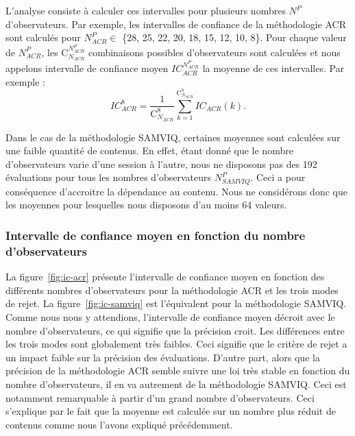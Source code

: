 L'analyse consiste à calculer ces intervalles pour plusieurs nombres $N^P$ d'observateurs. Par exemple, les intervalles de confiance de la méthodologie ACR sont calculés pour $N_{\mathit{ACR}}^P \in$ \{28, 25, 22, 20, 18, 15, 12, 10, 8\}. Pour chaque valeur de $N_{\mathit{ACR}}^P$, les $\text{C}_{N_\mathit{ACR}}^{N_{\mathit{ACR}}^P}$ combinaisons possibles d'observateurs sont calculées et nous appelons intervalle de confiance moyen $\mathit{IC}_{\mathit{ACR}}^{N_{\mathit{ACR}}^P}$ la moyenne de ces intervalles. Par exemple :
\begin{equation}
\mathit{IC}_{\mathit{ACR}}^8 = \frac{1}{\text{C}_{N_\mathit{ACR}}^8} \sum_{k=1}^{\text{C}_{N_\mathit{ACR}}^8} \mathit{IC}_{\mathit{ACR}}(k).
\end{equation}

Dans le cas de la méthodologie SAMVIQ, certaines moyennes sont calculées sur une faible quantité de contenus. En effet, étant donné que le nombre d'observateurs varie d'une session à l'autre, nous ne disposons pas des 192 évaluations pour tous les nombres d'observateurs $N_{\mathit{SAMVIQ}}^P$. Ceci a pour conséquence d'accroitre la dépendance au contenu. Nous ne considérons donc que les moyennes pour lesquelles nous disposons d'au moins 64 valeurs.


\subsubsection{Intervalle de confiance moyen en fonction du nombre d'observateurs}
La figure~\ref{fig:ic-acr} présente l'intervalle de confiance moyen en fonction des différents nombres d'observateurs pour la méthodologie ACR et les trois modes de rejet. La figure~\ref{fig:ic-samviq} est l'équivalent pour la méthodologie SAMVIQ. Comme nous nous y attendions, l'intervalle de confiance moyen décroit avec le nombre d'observateurs, ce qui signifie que la précision croit. Les différences entre les trois modes sont globalement très faibles. Ceci signifie que le critère de rejet a un impact faible sur la précision des évaluations. D'autre part, alors que la précision de la méthodologie ACR semble suivre une loi très stable en fonction du nombre d'observateurs, il en va autrement de la méthodologie SAMVIQ. Ceci est notamment remarquable à partir d'un grand nombre d'observateurs. Ceci s'explique par le fait que la moyenne est calculée sur un nombre plus réduit de contenus comme nous l'avons expliqué précédemment.

